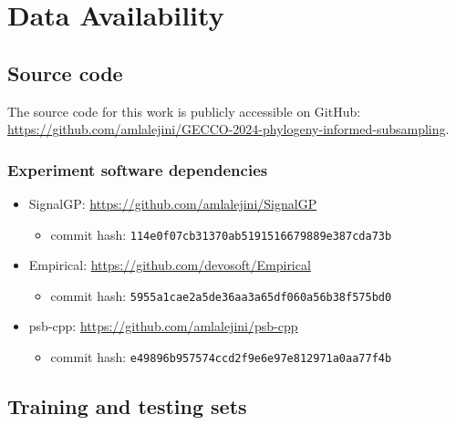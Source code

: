 \documentclass[
]{book}
\newcommand{\passthrough}[1]{#1}
\providecommand{\tightlist}{%
  \setlength{\itemsep}{0pt}\setlength{\parskip}{0pt}}
\begin{document}
\hypertarget{data-availability}{%
\chapter{Data Availability}\label{data-availability}}

\hypertarget{source-code}{%
\section{Source code}\label{source-code}}

The source code for this work is publicly accessible on GitHub: \url{https://github.com/amlalejini/GECCO-2024-phylogeny-informed-subsampling}.

\hypertarget{experiment-software-dependencies}{%
\subsection{Experiment software dependencies}\label{experiment-software-dependencies}}

\begin{itemize}
\tightlist
\item
  SignalGP: \url{https://github.com/amlalejini/SignalGP}

  \begin{itemize}
  \tightlist
  \item
    commit hash: \passthrough{\lstinline!114e0f07cb31370ab5191516679889e387cda73b!}
  \end{itemize}
\item
  Empirical: \url{https://github.com/devosoft/Empirical}

  \begin{itemize}
  \tightlist
  \item
    commit hash: \passthrough{\lstinline!5955a1cae2a5de36aa3a65df060a56b38f575bd0!}
  \end{itemize}
\item
  psb-cpp: \url{https://github.com/amlalejini/psb-cpp}

  \begin{itemize}
  \tightlist
  \item
    commit hash: \passthrough{\lstinline!e49896b957574ccd2f9e6e97e812971a0aa77f4b!}
  \end{itemize}
\end{itemize}

\hypertarget{training-and-testing-sets}{%
\section{Training and testing sets}\label{training-and-testing-sets}}
\end{document}
